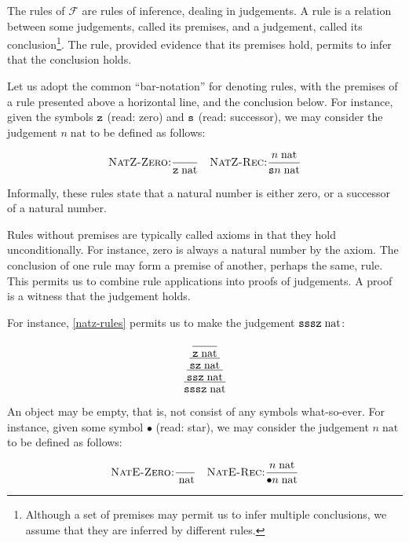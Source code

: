 
The rules of $\mathcal{F}$ are rules of inference, dealing in judgements. A
rule is a relation between some judgements, called its premises, and a
judgement, called its conclusion\footnote{Although a set of premises may permit
us to infer multiple conclusions, we assume that they are inferred by different
rules.}. The rule, provided evidence that its premises hold, permits to infer
that the conclusion holds.

Let us adopt the common ``bar-notation'' for denoting rules, with the premises
of a rule presented above a horizontal line, and the conclusion below. For
instance, given the symbols $\mathtt{z}$ (read: zero) and $\mathtt{s}$ (read:
successor), we may consider the judgement $n\;\text{nat}$ to be defined as
follows:

\begin{equation}\label{natz-rules}
\sequent[NatZ-Zero]{}{\symb{z}\;\text{nat}}
\quad
\sequent[NatZ-Rec]{n\;\text{nat}}{{\symb{s}n\;\text{nat}}}
\end{equation}

Informally, these rules state that a natural number is either zero, or a
successor of a natural number.

Rules without premises are typically called axioms in that they hold
unconditionally. For instance, zero is always a natural number by the
 axiom. The conclusion of one rule may form a premise of
another, perhaps the same, rule. This permits us to combine rule applications
into proofs of judgements. A proof is a witness that the judgement holds.

For instance, \ref{natz-rules} permits us to make the judgement
$\mathtt{s}\mathtt{s}\mathtt{s}\mathtt{z}\;\text{nat}$:

$$
\sequent{
  \sequent{
    \sequent{
      \sequent{
      }{\symb{z}\;\text{nat}}
    }{\symb{s}\symb{z}\;\text{nat}}
  }{\symb{s}\symb{s}\symb{z}\;\text{nat}}
}{\symb{s}\symb{s}\symb{s}\symb{z}\;\text{nat}}
$$

An object may be empty, that is, not consist of any symbols what-so-ever. For
instance, given some symbol $\bullet$ (read: star), we may consider the judgement
$n\;\text{nat}$ to be defined as follows:

\begin{equation}\label{nate-rules}
\sequent[NatE-Zero]{}{\;\text{nat}}
\quad
\sequent[NatE-Rec]{n\;\text{nat}}{\bullet n\;\text{nat}}
\end{equation}

